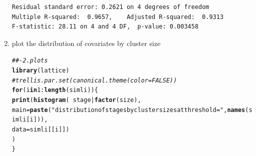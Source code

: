 \documentclass[]{revtex4}\usepackage[]{graphicx}\usepackage[]{color}
\makeatletter
\newcommand{\hlnum}[1]{\textcolor[rgb]{0.686,0.059,0.569}{#1}}%
\newcommand{\hlstr}[1]{\textcolor[rgb]{0.192,0.494,0.8}{#1}}%
\newcommand{\hlcom}[1]{\textcolor[rgb]{0.678,0.584,0.686}{\textit{#1}}}%
\newcommand{\hlopt}[1]{\textcolor[rgb]{0,0,0}{#1}}%
\newcommand{\hlstd}[1]{\textcolor[rgb]{0.345,0.345,0.345}{#1}}%
\newcommand{\hlkwa}[1]{\textcolor[rgb]{0.161,0.373,0.58}{\textbf{#1}}}%
\newcommand{\hlkwc}[1]{\textcolor[rgb]{0.333,0.667,0.333}{#1}}%
\newcommand{\hlkwd}[1]{\textcolor[rgb]{0.737,0.353,0.396}{\textbf{#1}}}%
\newenvironment{kframe}{%
 \def\at@end@of@kframe{}%
 \ifinner\ifhmode%
  \def\at@end@of@kframe{\end{minipage}}%
  \begin{minipage}{\columnwidth}%
 \fi\fi%
 \def\FrameCommand##1{\hskip\@totalleftmargin \hskip-\fboxsep
 \colorbox{shadecolor}{##1}\hskip-\fboxsep
     \hskip-\linewidth \hskip-\@totalleftmargin \hskip\columnwidth}%
 \MakeFramed {\advance\hsize-\width
   \@totalleftmargin\z@ \linewidth\hsize
   \@setminipage}}%
 {\par\unskip\endMakeFramed%
 \at@end@of@kframe}
\newenvironment{knitrout}{}{} %
\makeatother
\begin{document}
\begin{enumerate}
\begin{knitrout}
\begin{kframe}
\begin{verbatim}
Residual standard error: 0.2621 on 4 degrees of freedom
Multiple R-squared:  0.9657,	Adjusted R-squared:  0.9313 
F-statistic: 28.11 on 4 and 4 DF,  p-value: 0.003458
\end{verbatim}
\end{kframe}
\end{knitrout}


\item plot the distribution of covariates by cluster size

\begin{knitrout}
\color{fgcolor}\begin{kframe}
\begin{alltt}
\hlcom{##- 2. plots}
\hlkwd{library}\hlstd{(lattice)}
\hlcom{# trellis.par.set(canonical.theme(color = FALSE))}
\hlkwa{for}\hlstd{(i} \hlkwa{in} \hlnum{1}\hlopt{:}\hlkwd{length}\hlstd{(simli))\{}
  \hlkwd{print}\hlstd{(}\hlkwd{histogram}\hlstd{(}\hlopt{~} \hlstd{stage}\hlopt{|}\hlkwd{factor}\hlstd{(size),}
            \hlkwc{main} \hlstd{=} \hlkwd{paste}\hlstd{(}\hlstr{"distribution of stages by cluster sizes at threshold ="}\hlstd{,} \hlkwd{names}\hlstd{(simli[i])),}
            \hlkwc{data} \hlstd{= simli[[i]])}
  \hlstd{)}
\hlstd{\}}
\end{alltt}
\end{kframe}


\end{knitrout}
\end{enumerate}
\end{document}
